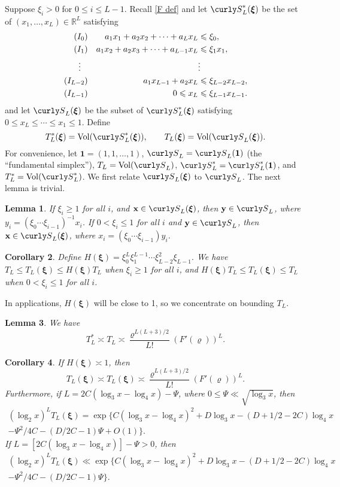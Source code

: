 \documentclass[11pt]{amsart}
\theoremstyle{remark}
\theoremstyle{plain}
\newtheorem{lem}{Lemma}[section]
\newtheorem{lemcor}[lem]{Corollary}
\numberwithin{equation}{section}
\newcommand{\RR}{{\mathbb R}}
\renewcommand{\(}{\left(}
\renewcommand{\)}{\right)}
\newcommand{\fancyS}{{\curly S}}
\renewcommand{\le}{\leqslant}
\renewcommand{\ge}{\geqslant}
\newcommand{\vone}{{\mathbf{1}}}
\renewcommand{\rho}{\varrho}
\newcommand{\bxi}{\boldsymbol\xi}
\newcommand{\vxi}{\bxi}
\newcommand{\order}{\asymp}
\newcommand{\vx}{\mathbf{x}}
\newcommand{\vy}{\mathbf{y}}
\DeclareMathOperator{\vvol}{Vol}
\begin{document}
Suppose $\xi_i > 0$ for $0\le i\le L-1$.
Recall \eqref{F def} and
let $\fancyS_L^*(\bxi)$ be the set of $(x_1, \ldots, x_L) \in\RR^L$ satisfying
\begin{align*}
(I_0) & &a_1x_1 + a_2x_2 + \cdots + a_L x_L &\le \xi_0, \hfill \\
(I_1) & &a_1x_2 + a_2x_3 + \cdots + a_{L-1}x_L &\le \xi_1 x_1, \\
\vdots\;\;\; && &\vdots\\
(I_{L-2}) & &a_1 x_{L-1} + a_2 x_{L} &\le \xi_{L-2} x_{L-2}, \\
(I_{L-1}) & & 0\le x_{L} &\le \xi_{L-1} x_{L-1}.
\end{align*}
and let $\fancyS_L(\bxi)$ be the subset of $\fancyS_L^*(\bxi)$ satisfying
$0 \le x_L \le \cdots \le x_1 \le 1$.
Define
$$
T_L^*(\bxi) = \vvol(\fancyS_L^*(\bxi)), \qquad T_L(\bxi) =
\vvol(\fancyS_L(\bxi)).
$$
For convenience, let $\vone=(1,1,\ldots,1)$,
$\fancyS_L = \fancyS_L(\vone)$ (the
``fundamental simplex''), $T_L = \vvol(\fancyS_L)$,
$\fancyS_L^*=\fancyS_L^*(\vone)$, and $T_L^*=\vvol ( \fancyS_L^*)$.
We first relate
$\fancyS_L(\vxi)$ to $\fancyS_L$.  The next lemma is trivial.

\begin{lem}\label{xi1}  
If $\xi_i\ge 1$ for all $i$, and $\vx\in\fancyS_L(\vxi)$,
then $\vy\in\fancyS_L$, where $y_i = (\xi_0\cdots \xi_{i-1})^{-1} x_i$.
If $0<\xi_i\le 1$ for all $i$ and $\vy\in \fancyS_L$, then $\vx\in\fancyS_L(\vxi)$, where $x_i = (\xi_0 \cdots \xi_{i-1})y_i$.
\end{lem}

\begin{lemcor}\label{TLxi} Define
$H(\vxi) = \xi_0^L \xi_1^{L-1} \cdots \xi_{L-2}^2 \xi_{L-1}.$
 We have $T_L \le T_L(\vxi) \le H(\vxi) T_L$
when $\xi_i\ge 1$ for all $i$, and
$H(\vxi) T_L \le T_L(\vxi) \le T_L$ when $0<\xi_i\le 1$ for all $i$.
\end{lemcor}

In applications, $H(\vxi)$ will be close to 1, so we
concentrate on bounding $T_L$.

\begin{lem}\label{TL}
We have
$$
T_L^* \order T_L \order  \frac{\rho^{L(L+3)/2}}{L!}(F'(\rho))^L.
$$
\end{lem}

\begin{lemcor}\label{TL cor} If $H(\vxi) \order 1$, then
$$
T_L(\bxi) \order T_L(\bxi) \order  \frac{\rho^{L(L+3)/2}}{L!}(F'(\rho))^L.
$$
Furthermore, if $L=2C (\log_3 x - \log_4 x) - \Psi$, where $0 \le \Psi \ll
\sqrt{\log_3 x}$, then
\begin{multline*}
(\log_2 x)^L T_L(\vxi) = \exp \{ C(\log_3 x-\log_4 x)^2
 + D\log_3 x - (D+1/2-2C) \log_4 x \\
-\Psi^2/4C - (D/2C-1)\Psi + O(1) \}.
\end{multline*}
If $L=[2C (\log_3 x - \log_4 x)] - \Psi > 0$, then
\begin{multline*}
(\log_2 x)^L T_L(\bxi) \ll \exp \{ C(\log_3 x-\log_4 x)^2
 + D\log_3 x - (D+1/2-2C) \log_4 x \\
-\Psi^2/4C - (D/2C-1)\Psi \}.
\end{multline*}
\end{lemcor}
\end{document}
